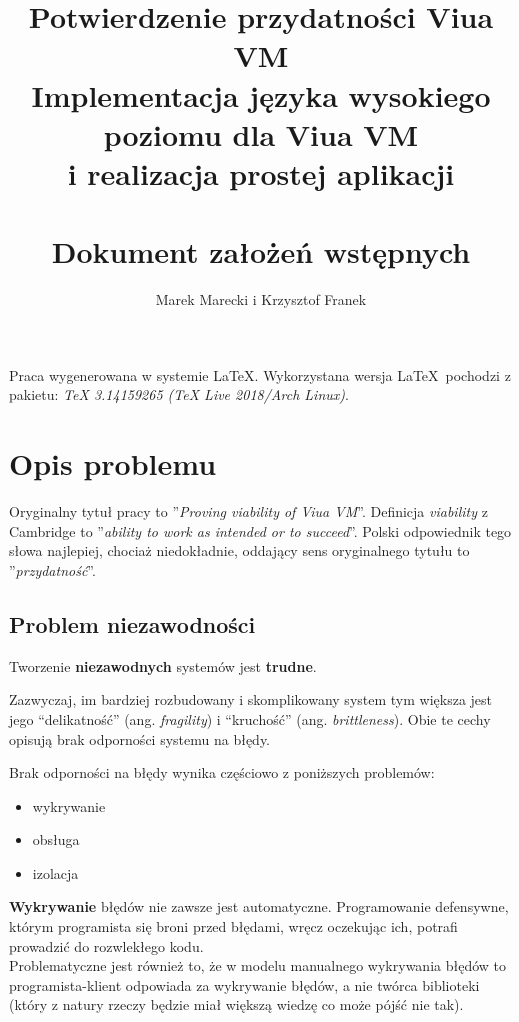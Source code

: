 \documentclass[11pt,oneside,a4paper,titlepage,onecolumn]{article}
\author{Marek Marecki i Krzysztof Franek}
\title{%
    Potwierdzenie przydatności Viua VM \\
    \large Implementacja języka wysokiego poziomu dla Viua VM \\
    i realizacja prostej aplikacji \\
    ~\\
    Dokument założeń wstępnych}
\begin{document}
\maketitle

Praca wygenerowana w systemie \LaTeX.
Wykorzystana wersja \LaTeX~pochodzi z pakietu: \emph{TeX 3.14159265 (TeX Live 2018/Arch Linux)}.

\tableofcontents

\newpage

\section{Opis problemu}
\label{opis_problemu}

Oryginalny tytuł pracy to ''\emph{Proving viability of Viua VM}''. Definicja \emph{viability} z Cambridge to
''\emph{ability to work as intended or to succeed}''. Polski odpowiednik tego słowa najlepiej, chociaż
niedokładnie, oddający sens oryginalnego tytułu to ''\emph{przydatność}''.

\subsection{Problem niezawodności}

\begin{center}
    Tworzenie \textbf{niezawodnych} systemów jest \textbf{trudne}.
\end{center}

Zazwyczaj, im bardziej rozbudowany i skomplikowany system tym większa jest
jego ``delikatność'' (ang. \emph{fragility}) i ``kruchość'' (ang. \emph{brittleness}).
Obie te cechy opisują brak odporności systemu na błędy.

Brak odporności na błędy wynika częściowo z poniższych problemów:

\begin{itemize}
\item wykrywanie
\item obsługa
\item izolacja
\end{itemize}

\textbf{Wykrywanie} błędów nie zawsze jest automatyczne. Programowanie defensywne, którym
programista się broni przed błędami, wręcz oczekując ich, potrafi prowadzić do rozwlekłego kodu. \\
Problematyczne jest również to, że w modelu manualnego wykrywania błędów to programista-klient
odpowiada za wykrywanie błędów, a nie twórca biblioteki (który z natury rzeczy będzie miał większą
wiedzę co może pójść nie tak).
\end{document}
